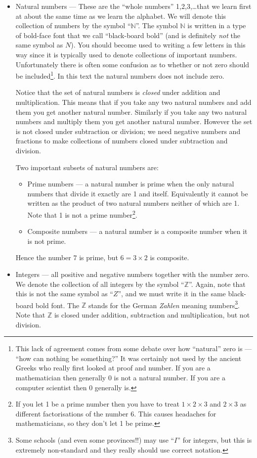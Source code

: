\begin{itemize}
\item Natural numbers --- These are the ``whole numbers'' 1,2,3,\dots that we
learn first at about the same time as we learn the alphabet. We will denote this
collection of numbers by the symbol ``$\mathbb{N}$''. The symbol $\mathbb{N}$ is
written in a type of bold-face font that we call ``black-board bold'' (and is
definitely \emph{not} the same symbol as $N$). You should become used to
writing a few letters in this way since it is typically used to denote
collections of important numbers.
Unfortunately there is often some confusion as to whether or not zero should be
included\footnote{This lack of agreement comes from some debate over how
``natural'' zero is --- ``how can nothing be something?'' It was certainly not
used by the ancient Greeks who really first looked at proof and number.
If you are a mathematician then generally $0$ is not a natural number. If you
are a computer scientist then $0$ generally is.}. In this text
the natural numbers does not include zero.

Notice that the set of natural numbers is \emph{closed} under addition and
multiplication. This means that if you take any two natural numbers and
add them you get another natural number. Similarly if you take any two natural
numbers and multiply them you get another natural number. However the set is not
closed under subtraction or division; we need negative numbers and fractions to
make collections of numbers closed under subtraction and division.

Two important subsets of natural numbers are:
\begin{itemize}
 \item Prime numbers --- a natural number is prime when the only natural
numbers that divide it exactly are 1 and itself. Equivalently it cannot be
written as the product of two natural numbers neither of which are 1. Note that
1 is not a prime number\footnote{If you let 1 be a prime number then you have
to treat $1\times2\times 3$ and $2\times 3$ as different factorisations of the
number 6. This causes headaches for mathematicians, so they don't let 1 be
prime.}.

\item Composite numbers --- a natural number is a composite number when it is
not prime.
\end{itemize}
Hence the number $7$ is prime, but $6 = 3\times 2$ is composite.

\item Integers --- all positive and negative numbers together with the number
zero. We denote the collection of all integers by the symbol ``$\mathbb{Z}$''.
Again, note that this is not the same symbol as ``$Z$'', and we must write it in
the same black-board bold font. The $\mathbb{Z}$ stands for the German
\emph{Zahlen} meaning numbers\footnote{Some schools (and even some provinces!!) may use
``$I$'' for integers, but this is extremely non-standard and they really should
use correct notation.}. Note that $\mathbb{Z}$ is closed under addition,
subtraction and multiplication, but not division.


\end{itemize}

